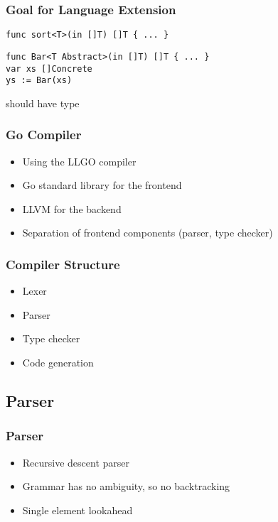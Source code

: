 \documentclass[12pt]{beamer}
\begin{document}

\begin{frame}[fragile]
\frametitle{Goal for Language Extension}

\begin{verbatim}
func sort<T>(in []T) []T { ... }
\end{verbatim}

\begin{verbatim}
func Bar<T Abstract>(in []T) []T { ... }
var xs []Concrete
ys := Bar(xs)
\end{verbatim}

 should have type 

\end{frame}


\begin{frame}[fragile]
\frametitle{Go Compiler}
\begin{itemize}
\item Using the LLGO compiler
\item Go standard library for the frontend
\item LLVM for the backend
\item Separation of frontend components (parser, type checker)
\end{itemize}
\end{frame}


\begin{frame}[fragile]
\frametitle{Compiler Structure}
\begin{itemize}
\item Lexer
\item Parser
\item Type checker
\item Code generation
\end{itemize}
\end{frame}

\subsection{Parser}

\begin{frame}[fragile]
\frametitle{Parser}
\begin{itemize}
\item Recursive descent parser
\item Grammar has no ambiguity, so no backtracking
\item Single element lookahead
\end{itemize}
\end{frame}
\end{document}
